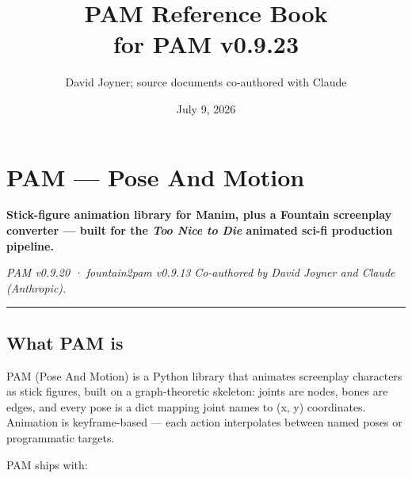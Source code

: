 \documentclass[
  11pt,
]{book}
\title{PAM Reference Book\\[0.4em]\normalsize for PAM v0.9.23}
\author{David Joyner; source documents co-authored with Claude}
\date{July 9, 2026}
\begin{document}
\frontmatter
\maketitle

{
\hypersetup{linkcolor=}
\setcounter{tocdepth}{3}
\tableofcontents
}
\mainmatter
\chapter{PAM --- Pose And Motion}\label{pam-pose-and-motion}

\textbf{Stick-figure animation library for Manim, plus a Fountain
screenplay converter --- built for the \emph{Too Nice to Die} animated
sci-fi production pipeline.}

\emph{PAM v0.9.20 · fountain2pam v0.9.13} \emph{Co-authored by David
Joyner and Claude (Anthropic).}

\begin{center}\rule{0.5\linewidth}{0.5pt}\end{center}

\section{What PAM is}\label{what-pam-is}

PAM (Pose And Motion) is a Python library that animates screenplay
characters as stick figures, built on a graph-theoretic skeleton: joints
are nodes, bones are edges, and every pose is a dict mapping joint names
to (x, y) coordinates. Animation is keyframe-based --- each action
interpolates between named poses or programmatic targets.

PAM ships with:
\end{document}
